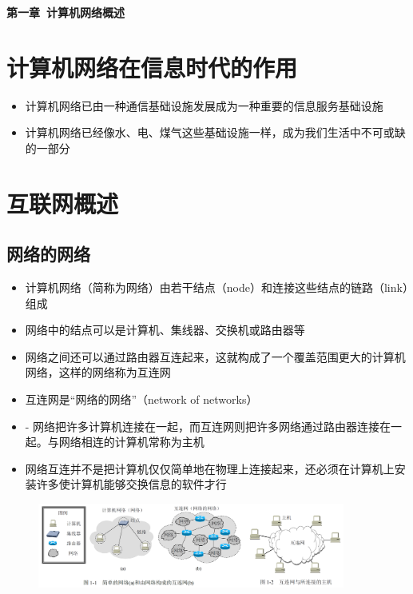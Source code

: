 \documentclass[cs4size,a4paper,10pt]{ctexart}
\begin{document}
	\begin{center}
		{\huge\textbf{第一章\ 计算机网络概述}}
	\end{center}
	\tableofcontents
	\clearpage

	\setcounter{page}{1}
	\setlength{\parskip}{0.65em}
	
	\section{计算机网络在信息时代的作用}
	\begin{itemize}
		\item 计算机网络已由一种通信基础设施发展成为一种重要的信息服务基础设施
		\item 计算机网络已经像水、电、煤气这些基础设施一样，成为我们生活中不可或缺的一部分
	\end{itemize}

	\section{互联网概述}

	\subsection{网络的网络}
	\begin{itemize}
		\item 计算机网络（简称为网络）由若干结点（node）和连接这些结点的链路（link）组成
		\item 网络中的结点可以是计算机、集线器、交换机或路由器等
		\item 网络之间还可以通过路由器互连起来，这就构成了一个覆盖范围更大的计算机网络，这样的网络称为互连网
		\item 互连网是“网络的网络”（network of networks）
		\item - 网络把许多计算机连接在一起，而互连网则把许多网络通过路由器连接在一起。与网络相连的计算机常称为主机
		\item 网络互连并不是把计算机仅仅简单地在物理上连接起来，还必须在计算机上安装许多使计算机能够交换信息的软件才行
	\end{itemize}

	\begin{figure}[H]
		\centering
		\includegraphics[width=0.9\textwidth]{img/1.1}
	\end{figure}
\end{document}
